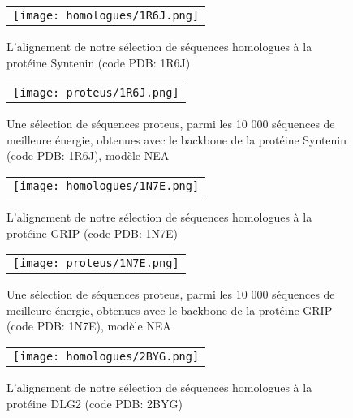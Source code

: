    \begin{figure}[!htbp]
     \centering
     \begin{tabular}{c}
       \texttt{[image: homologues/1R6J.png]} \\
     \end{tabular}
     \caption{L'alignement de notre sélection de séquences homologues à la protéine Syntenin (code PDB: 1R6J)}
\label{align_homo:Syntenin}
   \end{figure}

   \begin{figure}[!htbp]
     \centering
     \begin{tabular}{c}
       \texttt{[image: proteus/1R6J.png]} \\
     \end{tabular}
       \caption{Une sélection de séquences proteus, parmi les 10 000 séquences de meilleure énergie, obtenues avec le backbone de la protéine Syntenin (code PDB: 1R6J), modèle NEA}
\label{align_proteus:Syntenin}
   \end{figure}
\clearpage

   \begin{figure}[!htbp]
     \centering
     \begin{tabular}{c}
       \texttt{[image: homologues/1N7E.png]} \\
     \end{tabular}
     \caption{L'alignement de notre sélection de séquences homologues à la protéine GRIP (code PDB: 1N7E)}
\label{align_homo:GRIP}
   \end{figure}

   \begin{figure}[!htbp]
     \centering
     \begin{tabular}{c}
       \texttt{[image: proteus/1N7E.png]} \\
     \end{tabular}
       \caption{Une sélection de séquences proteus, parmi les 10 000 séquences de meilleure énergie, obtenues avec le backbone de la protéine GRIP (code PDB: 1N7E), modèle NEA}
\label{align_proteus:GRIP}
   \end{figure}
\clearpage

   \begin{figure}[!htbp]
     \centering
     \begin{tabular}{c}
       \texttt{[image: homologues/2BYG.png]} \\
     \end{tabular}
     \caption{L'alignement de notre sélection de séquences homologues à la protéine DLG2 (code PDB: 2BYG)}
\label{align_homo:DLG2}
   \end{figure}

